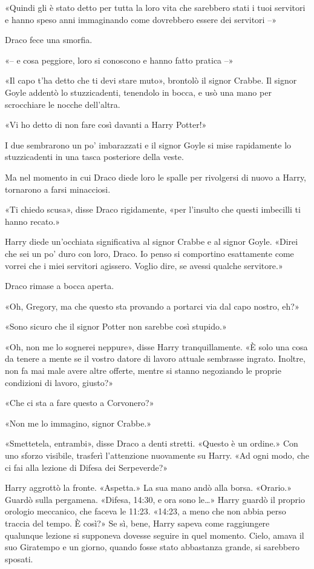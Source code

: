 «Quindi gli è stato detto per tutta la loro vita che sarebbero stati i tuoi servitori e hanno speso anni immaginando come dovrebbero essere dei servitori –»

Draco fece una smorfia.

«– e cosa peggiore, loro si conoscono e hanno fatto pratica –»

«Il capo t’ha detto che ti devi stare muto», brontolò il signor Crabbe. Il signor Goyle addentò lo stuzzicadenti, tenendolo in bocca, e usò una mano per scrocchiare le nocche dell’altra.

«Vi ho detto di non fare così davanti a Harry Potter!»

I due sembrarono un po’ imbarazzati e il signor Goyle si mise rapidamente lo stuzzicadenti in una tasca posteriore della veste.

Ma nel momento in cui Draco diede loro le spalle per rivolgersi di nuovo a Harry, tornarono a farsi minacciosi.

«Ti chiedo scusa», disse Draco rigidamente, «per l’insulto che questi imbecilli ti hanno recato.»

Harry diede un’occhiata significativa al signor Crabbe e al signor Goyle. «Direi che sei un po’ duro con loro, Draco. Io penso si comportino esattamente come vorrei che i miei servitori agissero. Voglio dire, se avessi qualche servitore.»

Draco rimase a bocca aperta.

«Oh, Gregory, ma che questo sta provando a portarci via dal capo nostro, eh?»

«Sono sicuro che il signor Potter non sarebbe così stupido.»

«Oh, non me lo sognerei neppure», disse Harry tranquillamente. «È solo una cosa da tenere a mente se il vostro datore di lavoro attuale sembrasse ingrato. Inoltre, non fa mai male avere altre offerte, mentre si stanno negoziando le proprie condizioni di lavoro, giusto?»

«Che ci sta a fare questo a Corvonero?»

«Non me lo immagino, signor Crabbe.»

«Smettetela, entrambi», disse Draco a denti stretti. «Questo è un ordine.» Con uno sforzo visibile, trasferì l’attenzione nuovamente su Harry. «Ad ogni modo, che ci fai alla lezione di Difesa dei Serpeverde?»

Harry aggrottò la fronte. «Aspetta.» La sua mano andò alla borsa. «Orario.» Guardò sulla pergamena. «Difesa, 14:30, e ora sono le…» Harry guardò il proprio orologio meccanico, che faceva le 11:23. «14:23, a meno che non abbia perso traccia del tempo. È così?» Se sì, bene, Harry sapeva come raggiungere qualunque lezione si supponeva dovesse seguire in quel momento. Cielo, amava il suo Giratempo e un giorno, quando fosse stato abbastanza grande, si sarebbero sposati.


